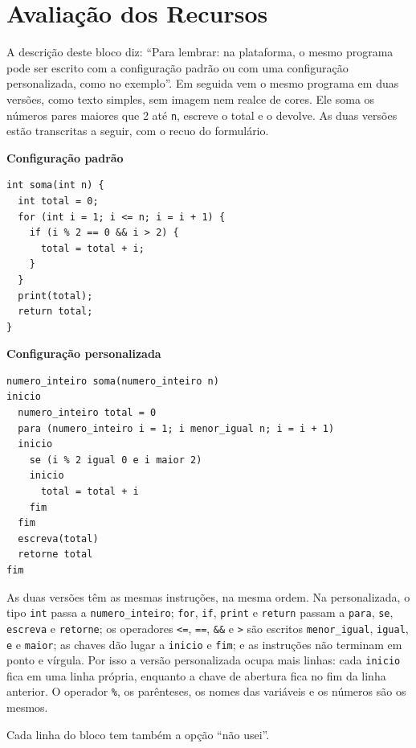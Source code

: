 \section{Avaliação dos Recursos}

A descrição deste bloco diz: ``Para lembrar: na plataforma, o mesmo programa pode ser escrito com a configuração padrão ou com uma configuração personalizada, como no exemplo''. Em seguida vem o mesmo programa em duas versões, como texto simples, sem imagem nem realce de cores. Ele soma os números pares maiores que 2 até \texttt{n}, escreve o total e o devolve. As duas versões estão transcritas a seguir, com o recuo do formulário.

\begin{center}
\begin{minipage}{0.9\textwidth}
\textbf{Configuração padrão}
\small
\begin{verbatim}
int soma(int n) {
  int total = 0;
  for (int i = 1; i <= n; i = i + 1) {
    if (i % 2 == 0 && i > 2) {
      total = total + i;
    }
  }
  print(total);
  return total;
}
\end{verbatim}

\textbf{Configuração personalizada}
\small
\begin{verbatim}
numero_inteiro soma(numero_inteiro n)
inicio
  numero_inteiro total = 0
  para (numero_inteiro i = 1; i menor_igual n; i = i + 1)
  inicio
    se (i % 2 igual 0 e i maior 2)
    inicio
      total = total + i
    fim
  fim
  escreva(total)
  retorne total
fim
\end{verbatim}
\end{minipage}
\end{center}

As duas versões têm as mesmas instruções, na mesma ordem. Na personalizada, o tipo \texttt{int} passa a \texttt{numero\_inteiro}; \texttt{for}, \texttt{if}, \texttt{print} e \texttt{return} passam a \texttt{para}, \texttt{se}, \texttt{escreva} e \texttt{retorne}; os operadores \texttt{<=}, \texttt{==}, \texttt{\&\&} e \texttt{>} são escritos \texttt{menor\_igual}, \texttt{igual}, \texttt{e} e \texttt{maior}; as chaves dão lugar a \texttt{inicio} e \texttt{fim}; e as instruções não terminam em ponto e vírgula. Por isso a versão personalizada ocupa mais linhas: cada \texttt{inicio} fica em uma linha própria, enquanto a chave de abertura fica no fim da linha anterior. O operador \texttt{\%}, os parênteses, os nomes das variáveis e os números são os mesmos.

Cada linha do bloco tem também a opção ``não usei''.

